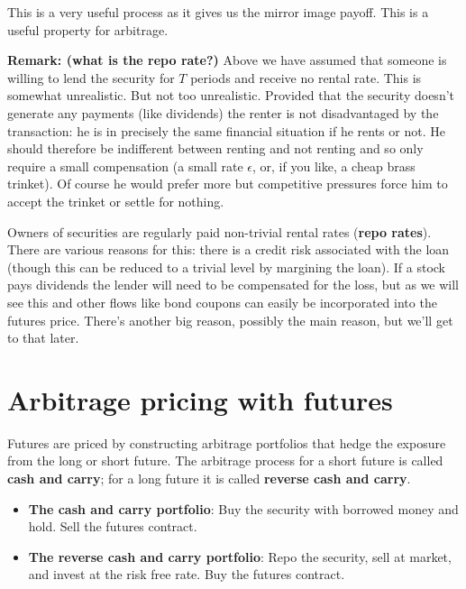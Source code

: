 This is a very useful process as it gives us the mirror image payoff. This is  a useful property for arbitrage. 

\textbf{Remark: (what is the repo rate?)} Above we have assumed that someone is willing to lend the security for $T$ periods and receive no rental rate. This is somewhat unrealistic. But not too unrealistic. Provided that the security doesn't generate any payments (like dividends) the renter is not disadvantaged by the transaction: he is in precisely the same financial situation if he rents or not. He should therefore be indifferent between renting and not renting and so only require a small compensation (a small rate $\epsilon$, or, if you like, a cheap brass trinket). Of course he would prefer more but competitive pressures force him to accept the trinket or settle for nothing.

Owners of securities are regularly paid non-trivial rental rates (\textbf{repo rates}). There are various reasons for this: there is a credit risk associated with the loan (though this can be reduced to a trivial level by margining the loan). If a stock pays dividends the lender will need to be compensated for the loss, but as we will see this and other flows like bond coupons can easily be incorporated into the futures price. There's another big reason, possibly the main reason, but we'll get to that later.

\section{Arbitrage pricing with futures}
 
Futures are priced by constructing arbitrage portfolios that hedge the exposure from the long or short future. The arbitrage process for a short future is called \textbf{cash and carry}; for a long future it is called \textbf{reverse cash and carry}. 

\begin{itemize}
\item \textbf{The cash and carry portfolio}: Buy the security with borrowed money and hold. Sell the futures contract. 
\item \textbf{The reverse cash and carry portfolio}: Repo the security, sell at market, and invest at the risk free rate. Buy the futures contract.
\end{itemize}


